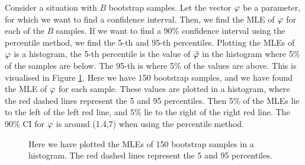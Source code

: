 Consider a situation with $B$ bootstrap samples. Let the vector $\varphi$ be a parameter, for which we want to find a confidence interval. Then, we find the MLE of $\varphi$ for each of the $B$ samples.
If we want to find a 90\% confidence interval using the percentile method, we find the 5-th and 95-th percentiles. 
Plotting the MLEs of $\varphi$ is a histogram, the 5-th percentile is the value of $\hat{\varphi}$ in the histogram where 5\% of the samples are below. The 95-th is where 5\% of the values are above. This is visualised in Figure \ref{percentile_ci_example}. Here we have 150 bootstrap samples, and we have found the MLE of $\varphi$ for each sample. These values are plotted in a histogram, where the red dashed lines represent the 5 and 95 percentiles. Then 5\% of the MLEs lie to the left of the left red line, and 5\% lie to the right of the right red line. The 90\% CI for $\varphi$ is around (1.4,7) when using the percentile method.
\begin{figure}
    \centering
    
    \caption[Bootstrap Example]{Here we have plotted the MLEs of 150 bootstrap samples in a histogram. The red dashed lines represent the 5 and 95 percentiles.}
    \label{percentile_ci_example}
\end{figure}
